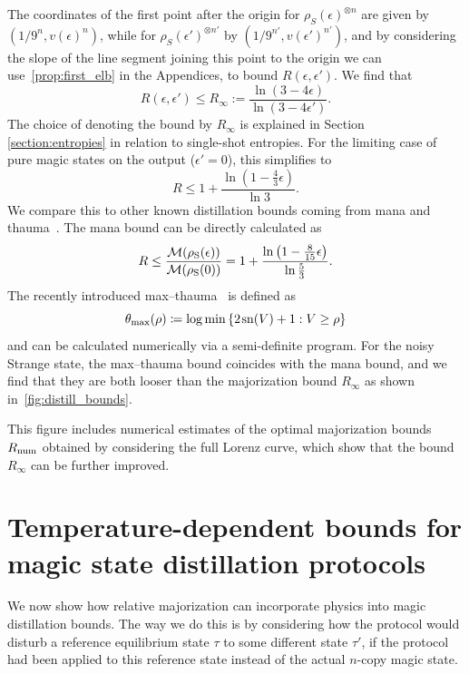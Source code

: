 \documentclass[pra,
aps,
twocolumn,
superscriptaddress,
groupedaddress,
nofootinbib,
reprint
]{revtex4-1}
\begin{document}
The coordinates of the first point after the origin for $\rho_S(\epsilon)^{\otimes n}$ are given by $(1/9^n, v(\epsilon)^n)$, while for $\rho_S(\epsilon')^{\otimes n'}$ by $(1/9^{n'}, v(\epsilon')^{n'})$, and by considering the slope of the line segment joining this point to the origin we can use~\cref{prop:first_elb} in the Appendices, to bound $R(\epsilon, \epsilon')$. We find that
\begin{equation}\label{eq:unital-bound}
	R(\epsilon, \epsilon') \leq R_\infty :=\frac{\ln (3-4\epsilon)}{\ln (3-4\epsilon')}.
\end{equation}
The choice of denoting the bound by $R_\infty$ is explained in Section \ref{section:entropies} in relation to single-shot entropies. For the limiting case of pure magic states on the output ($\epsilon'=0$), this simplifies to
\begin{equation}
	R \leq 1 + \frac{\ln (1 - \frac{4}{3} \epsilon)}{\ln 3}.
\end{equation}
We compare this to other known distillation bounds coming from mana and thauma~\cite{Wang_2020}. The mana bound can be directly calculated as
\begin{equation}
	R \leq \frac{{\mathcal M}(\rho_{\rm{S}}(\epsilon))}{{\mathcal M}(\rho_{\rm{S}}(0))} = 1 + \frac{\ln \left(1 - \frac{8}{15}\epsilon \right)}{\ln \frac{5}{3}}.
\end{equation}
The recently introduced max--thauma~\cite{Wang_2020} is defined as
\begin{equation}
	\theta_{\rm{max}}(\rho) \coloneqq \log{\min{\{2\hspace{1pt} {{\rm{sn}}(V)} +1 : V \geq \rho\}}}
\end{equation}
and can be calculated numerically via a semi-definite program. For the noisy Strange state, the max--thauma bound coincides with the mana bound, and we find that they are both looser than the majorization bound $R_\infty$ as shown in~\cref{fig:distill_bounds}. 

This figure includes numerical estimates of the optimal majorization bounds $R_{\rm{num}}$ obtained by considering the full Lorenz curve, which show that the bound $R_\infty$ can be further improved.

\section{Temperature-dependent bounds for magic state distillation protocols}
\label{sec:stab}

We now show how relative majorization can incorporate physics into magic distillation bounds. The way we do this is by considering how the protocol would disturb a reference equilibrium state $\tau$ to some different state $\tau'$, if the protocol had been applied to this reference state instead of the actual $n$-copy magic state. 
\end{document}

